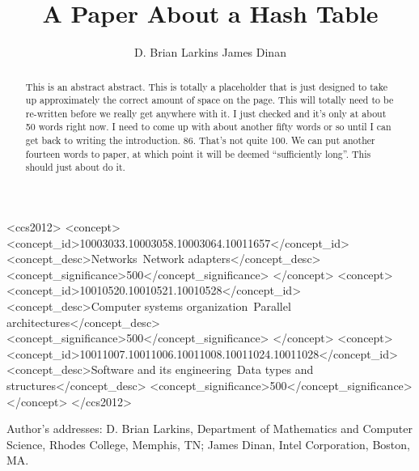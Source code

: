 \documentclass[prodmode]{acmsmall} %
\begin{document}

\title{A Paper About a Hash Table}
\author{D. Brian Larkins
James Dinan
}


\begin{abstract}
This is an abstract abstract. This is totally a placeholder that is
just designed to take up approximately the correct amount of space on
the page. This will totally need to be re-written before we really get
anywhere with it. I just checked and it's only at about 50 words right
now. I need to come up with about another fifty words or so until I
can get back to writing the introduction. 86. That's not quite
100. We can put another fourteen words to paper, at which point it
will be deemed ``sufficiently long''.  This should just about do it.
\end{abstract}


%
%
\begin{CCSXML}
<ccs2012>
<concept>
<concept_id>10003033.10003058.10003064.10011657</concept_id>
<concept_desc>Networks~Network adapters</concept_desc>
<concept_significance>500</concept_significance>
</concept>
<concept>
<concept_id>10010520.10010521.10010528</concept_id>
<concept_desc>Computer systems organization~Parallel architectures</concept_desc>
<concept_significance>500</concept_significance>
</concept>
<concept>
<concept_id>10011007.10011006.10011008.10011024.10011028</concept_id>
<concept_desc>Software and its engineering~Data types and structures</concept_desc>
<concept_significance>500</concept_significance>
</concept>
</ccs2012>
\end{CCSXML}



%
%



\begin{bottomstuff}

Author's addresses: D. Brian Larkins, Department of Mathematics and Computer Science,
Rhodes College, Memphis, TN;
James Dinan, Intel Corporation, Boston, MA.

\end{bottomstuff}
\end{document}
